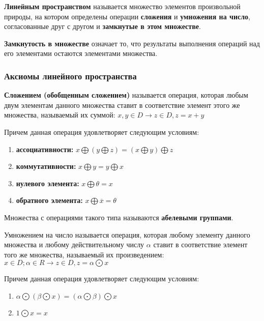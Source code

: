 \documentclass{article}
\begin{document}
\begin{flushleft}

\textbf{Линейным пространством} называется множество элементов произвольной природы, на котором определены операции \textbf{сложения} и \textbf{умножения на число}, согласованные друг с другом и \textbf{замкнутые в этом множестве}.

\hfill

\textbf{Замкнутость в множестве} означает то, что результаты выполнения операций над его элементами остаются элементами множества.

\subsubsection{Аксиомы линейного пространства}

\textbf{Сложением (обобщенным сложением)} называется операция, которая любым двум элементам данного множества ставит в соответствие элемент этого же множества, называемый их суммой: $x, y \in D \rightarrow z \in D, z = x + y$

Причем данная операция удовлетворяет следующим условиям:

\begin{enumerate}
    \item \textbf{ассоциативности:} $x \bigoplus (y \bigoplus z) = (x \bigoplus y) \bigoplus z$
    \item \textbf{коммутативности:} $x \bigoplus y = y \bigoplus x$
    \item \textbf{нулевого элемента:} $x \bigoplus \theta = x$
    \item \textbf{обратного элемента:} $x \bigoplus \overline{x} = \theta$
\end{enumerate}

Множества с операциями такого типа называются \textbf{абелевыми группами}.

\hfill

Умножением на число называется операция, которая любому элементу данного множества и любому действительному числу $\alpha$ ставит в соответствие элемент того же множества, называемый их произведением: $x \in D; \alpha \in R \rightarrow z \in D, z = \alpha \bigodot x$

Причем данная операция удовлетворяет следующим условиям:

\begin{enumerate}
    \item $\alpha \bigodot (\beta \bigodot x) = (\alpha \bigodot \beta) \bigodot x$
    \item $1 \bigodot x = x$
\end{enumerate}


\end{flushleft}
\end{document}

